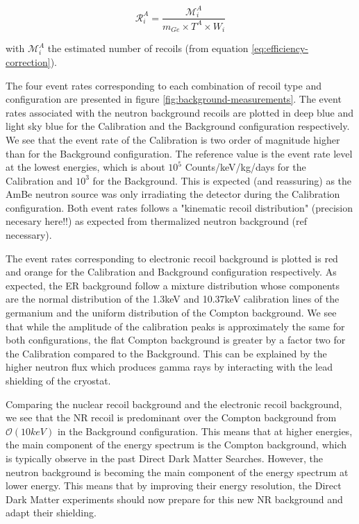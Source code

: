 \begin{equation}
\mathcal{R}_i^A = \frac{ \mathcal{M}_{i}^{A} }{ m_{Ge} \times T^A \times W_i}
\end{equation}

with $\mathcal{M}_{i}^{A}$ the estimated number of recoils (from equation \ref{eq:efficiency-correction}).

The four event rates corresponding to each combination of recoil type and configuration are presented in figure \ref{fig:background-measurements}. 
The event rates associated with the neutron background recoils are plotted in deep blue and light sky blue for the Calibration and the Background configuration respectively. We see that the event rate of the Calibration is two order of magnitude higher than for the Background configuration. The reference value is the event rate level at the lowest energies, which is about $10^5$ Counts/keV/kg/days for the Calibration and $10^3$ for the Background. This is expected (and reassuring) as the AmBe neutron source was only irradiating the detector during the Calibration configuration. Both event rates follows a "kinematic recoil distribution" (precision necesary here!!) as expected from thermalized neutron background (ref necessary). 

The event rates corresponding to electronic recoil background is plotted is red and orange for the Calibration and Background configuration respectively. As expected, the ER background follow a mixture distribution whose components are the normal distribution of the 1.3keV and 10.37keV calibration lines of the germanium and the uniform distribution of the Compton background. We see that while the amplitude of the calibration peaks is approximately the same for both configurations, the flat Compton background is greater by a factor two for the Calibration compared to the Background. This can be explained by the higher neutron flux which produces gamma rays by interacting with the lead shielding of the cryostat.

Comparing the nuclear recoil background and the electronic recoil background, we see that the NR recoil is predominant over the Compton background from $\mathcal{O}(10keV)$ in the Background configuration. This means that at higher energies, the main component of the energy spectrum is the Compton background, which is typically observe in the past Direct Dark Matter Searches. However, the neutron background is becoming the main component of the energy spectrum at lower energy. This means that by improving their energy resolution, the Direct Dark Matter experiments should now prepare for this new NR background and adapt their shielding. 

